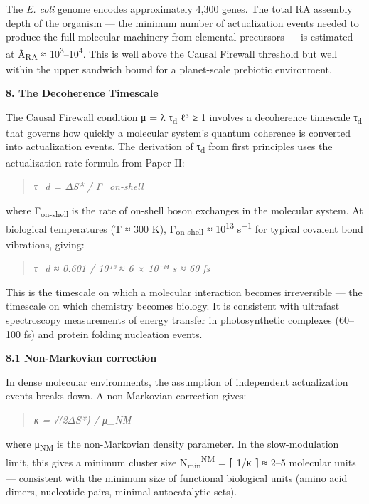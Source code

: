 \documentclass[12pt,a4paper]{article}
\begin{document}
The \emph{E. coli} genome encodes approximately 4,300 genes. The total
RA assembly depth of the organism --- the minimum number of
actualization events needed to produce the full molecular machinery from
elemental precursors --- is estimated at Ã\textsubscript{RA} ≈
10\textsuperscript{3}--10\textsuperscript{4}. This is well above the
Causal Firewall threshold but well within the upper sandwich bound for a
planet-scale prebiotic environment.

\textbf{8. The Decoherence Timescale}

The Causal Firewall condition μ = λ τ\textsubscript{d} ℓ³ ≥ 1 involves a
decoherence timescale τ\textsubscript{d} that governs how quickly a
molecular system's quantum coherence is converted into actualization
events. The derivation of τ\textsubscript{d} from first principles uses
the actualization rate formula from Paper II:

\begin{quote}
\emph{τ\_d = ΔS* / Γ\_on-shell}
\end{quote}

where Γ\textsubscript{on-shell} is the rate of on-shell boson exchanges
in the molecular system. At biological temperatures (T ≈ 300 K),
Γ\textsubscript{on-shell} ≈ 10\textsuperscript{13} s\textsuperscript{−1}
for typical covalent bond vibrations, giving:

\begin{quote}
\emph{τ\_d ≈ 0.601 / 10¹³ ≈ 6 × 10⁻¹⁴ s ≈ 60 fs}
\end{quote}

This is the timescale on which a molecular interaction becomes
irreversible --- the timescale on which chemistry becomes biology. It is
consistent with ultrafast spectroscopy measurements of energy transfer
in photosynthetic complexes (60--100 fs) and protein folding nucleation
events.

\textbf{8.1 Non-Markovian correction}

In dense molecular environments, the assumption of independent
actualization events breaks down. A non-Markovian correction gives:

\begin{quote}
\emph{κ = √(2ΔS*) / μ\_NM}
\end{quote}

where μ\textsubscript{NM} is the non-Markovian density parameter. In the
slow-modulation limit, this gives a minimum cluster size
N\textsubscript{min}\textsuperscript{NM} = ⌈ 1/κ ⌉ ≈ 2--5 molecular
units --- consistent with the minimum size of functional biological
units (amino acid dimers, nucleotide pairs, minimal autocatalytic sets).
\end{document}
